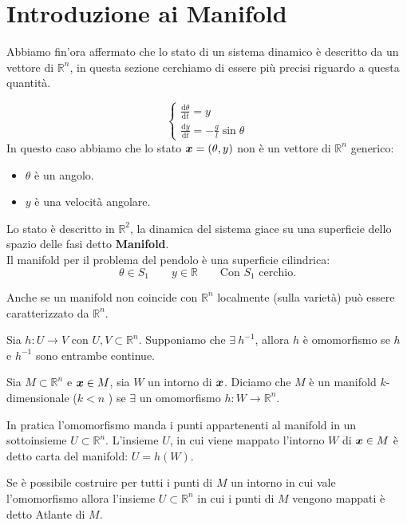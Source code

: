\section{Introduzione ai Manifold}%
\label{sub:Introduzione ai Manifold}
Abbiamo fin'ora affermato che lo stato di un sistema dinamico è descritto da un vettore di $\mathbb{R}^n$, in questa sezione cerchiamo di essere più precisi riguardo a questa quantità.
\begin{exmp}
    \[
        \begin{cases}
            \frac{\text{d} \theta}{\text{d} t} = y\\
	    \frac{\text{d} y}{\text{d} t} = -\frac{g}{l}\sin\theta
        \end{cases}
    \] 
    In questo caso abbiamo che lo stato $\boldsymbol{x} = (\theta, y)$ non è un vettore di $\mathbb{R}^n$ generico: 
    \begin{itemize}
        \item $\theta$ è un angolo. 
	\item $y$ è una velocità angolare.
    \end{itemize}
    Lo stato è descritto in $\mathbb{R}^2$, la dinamica del sistema giace su una superficie dello spazio delle fasi detto \textbf{Manifold}.\\
    Il manifold per il problema del pendolo è una superficie cilindrica:
    \[
        \theta\in S_1 \qquad y \in \mathbb{R}\qquad \text{Con $S_1$ cerchio}
    .\] 
\end{exmp}
\noindent
Anche se un manifold non coincide con $\mathbb{R}^n$ localmente (sulla varietà) può essere caratterizzato da $\mathbb{R}^n$.
\begin{defn}[Omomorfismo]
    Sia $h: U\to V$ con $U, V \subset \mathbb{R}^n$. Supponiamo che $\exists \ h^{-1}$, allora $h$ è omomorfismo se $h$ e $h^{-1}$ sono entrambe continue.
\end{defn}
\noindent
\begin{defn}
    Sia $M\subset \mathbb{R}^n$ e $\boldsymbol{x}  \in M$, sia $W$ un intorno di $\boldsymbol{x}$. Diciamo che $M$ è un manifold $k$-dimensionale ($k<n$ ) se $\exists$ un omomorfismo $h: W\to \mathbb{R}^n$.
\end{defn}
\noindent
In pratica l'omomorfismo manda i punti appartenenti al manifold in un sottoinsieme $U \subset \mathbb{R}^n$. L'insieme $U$, in cui viene mappato l'intorno $W$ di $\boldsymbol{x}\in M$ è detto carta del manifold: $U = h(W)$.\\
\begin{defn}
Se è possibile costruire per tutti i punti di $M$ un intorno in cui vale l'omomorfismo allora l'insieme $U \subset \mathbb{R}^n$ in cui i punti di $M$ vengono mappati è detto Atlante di $M$.
\end{defn}
